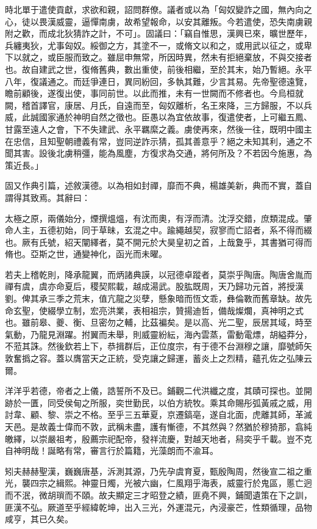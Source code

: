 \begin{pinyinscope}
時北單于遣使貢獻，求欲和親，詔問群僚。議者或以為「匈奴變詐之國，無內向之心，徒以畏漢威靈，逼憚南虜，故希望報命，以安其離叛。今若遣使，恐失南虜親附之歡，而成北狄猜詐之計，不可」。固議曰：「竊自惟思，漢興已來，曠世歷年，兵纏夷狄，尤事匈奴。綏御之方，其塗不一，或脩文以和之，或用武以征之，或卑下以就之，或臣服而致之。雖屈申無常，所因時異，然未有拒絕棄放，不與交接者也。故自建武之世，復脩舊典，數出重使，前後相繼，至於其末，始乃暫絕。永平八年，復議通之。而廷爭連日，異同紛回，多執其難，少言其易。先帝聖德遠覽，瞻前顧後，遂復出使，事同前世。以此而推，未有一世闕而不修者也。今烏桓就闕，稽首譯官，康居、月氏，自遠而至，匈奴離析，名王來降，三方歸服，不以兵威，此誠國家通於神明自然之徵也。臣愚以為宜依故事，復遣使者，上可繼五鳳、甘露至遠人之會，下不失建武、永平羈縻之義。虜使再來，然後一往，既明中國主在忠信，且知聖朝禮義有常，豈同逆詐示猜，孤其善意乎？絕之未知其利，通之不聞其害。設後北虜稍彊，能為風塵，方復求為交通，將何所及？不若因今施惠，為策近長。」

固又作典引篇，述敘漢德。以為相如封禪，靡而不典，楊雄美新，典而不實，蓋自謂得其致焉。其辭曰：

太極之原，兩儀始分，煙撰熅熅，有沈而奧，有浮而清。沈浮交錯，庶類混成。肇命人主，五德初始，同于草昧，玄混之中。踰繩越契，寂寥而亡詔者，系不得而綴也。厥有氏號，紹天闡繹者，莫不開元於大昊皇初之首，上哉夐乎，其書猶可得而脩也。亞斯之世，通變神化，函光而未曜。

若夫上稽乾則，降承龍翼，而炳諸典謨，以冠德卓蹤者，莫崇乎陶唐。陶唐舍胤而禪有虞，虞亦命夏后，稷契熙載，越成湯武。股肱既周，天乃歸功元首，將授漢劉。俾其承三季之荒末，值亢龍之災孽，懸象暗而恆文乖，彝倫斁而舊章缺。故先命玄聖，使綴學立制，宏亮洪業，表相祖宗，贊揚迪哲，備哉燦爛，真神明之式也。雖前皋、夔、衡、旦密勿之輔，比茲褊矣。是以高、光二聖，辰居其域，時至氣動，乃龍見淵躍。拊翼而未舉，則威靈紛紜，海內雲蒸，雷動電熛，胡縊莽分，不蒞其誅。然後欽若上下，恭揖群后，正位度宗，有于德不台淵穆之讓，靡號師矢敦奮撝之容。蓋以膺當天之正統，受克讓之歸運，蓄炎上之烈精，蘊孔佐之弘陳云爾。

洋洋乎若德，帝者之上儀，誥誓所不及已。鋪觀二代洪纖之度，其賾可探也。並開跡於一匱，同受侯甸之所服，奕世勤民，以伯方統牧。乘其命賜彤弧黃戚之威，用討韋、顧、黎、崇之不格。至乎三五華夏，京遷鎬亳，遂自北面，虎離其師，革滅天邑。是故義士偉而不敦，武稱未盡，護有慚德，不其然與？然猶於穆猗那，翕純皦繹，以崇嚴祖考，殷薦宗祀配帝，發祥流慶，對越天地者，舄奕乎千載。豈不克自神明哉！誕略有常，審言行於篇籍，光藻朗而不渝耳。

矧夫赫赫聖漢，巍巍唐基，泝測其源，乃先孕虞育夏，甄殷陶周，然後宣二祖之重光，襲四宗之緝熙。神靈日燭，光被六幽，仁風翔乎海表，威靈行於鬼區，慝亡迥而不泯，微胡瑣而不頤。故夫顯定三才昭登之績，匪堯不興，鋪聞遺策在下之訓，匪漢不弘。厥道至乎經緯乾坤，出入三光，外運混元，內浸豪芒，性類循理，品物咸亨，其已久矣。


\end{pinyinscope}
